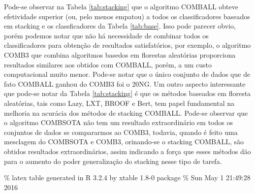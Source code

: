 \documentclass[]{article}
\begin{document}
Pode-se observar na Tabela \ref{tab:stacking} que o algoritmo COMBALL
obteve efetividade superior (ou, pelo menos empatou) a todos os
classificadores baseados em stacking e os classficadores da Tabela
\ref{tab:base}. Isso pode parecer obvio, porém podemos notar que não há
necessidade de combinar todos os classificadores para obtenção de
resultados satisfatórios, por exemplo, o algoritmo COMB3 que combina
algoritmos basedos em florestas aleatórias proporciona resultados
similares aos obtidos com COMBALL, porém, a um custo computacional muito
menor. Pode-se notar que o único conjunto de dados que de fato COMBALL
ganhou do COMB3 foi o 20NG. Um outro aspecto interessante que pode-se
notar da Tabela \ref{tab:stacking} é que os métodos baseados em floresta
aleatórias, tais como Lazy, LXT, BROOF e Bert, tem papel fundamental na
melhoria na acurácia dos métodos de stacking COMBALL. Pode-se observar
que o algoritmo COMBSOTA não tem um resultado extraordinário em todos os
conjuntos de dados se compararmos ao COMB3, todavia, quando é feito uma
mesclagem do COMBSOTA e COMB3, orinando-se o stacking COMBALL, são
obtidos resultados extraordinários, assim indicando a força que esses
métodos dão para o aumento do poder generalização do stacking nesse tipo
de tarefa.

\% latex table generated in R 3.2.4 by xtable 1.8-0 package \% Sun May 1
21:49:28 2016
\end{document}
